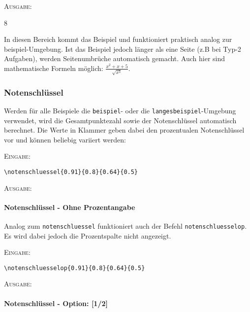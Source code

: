\documentclass[a4paper,12pt]{article}
\begin{document}
\textsc{Ausgabe:}

\begin{langesbeispiel} \item[8] %

In diesen Bereich kommt das Beispiel und funktioniert praktisch analog zur beispiel-Umgebung. Ist das Beispiel jedoch länger als eine Seite (z.B bei Typ-2 Aufgaben), werden Seitenumbrüche automatisch gemacht. Auch hier sind mathematische Formeln möglich:
$\frac{x^2+x+5}{\sqrt{x^3}}$.		

\end{langesbeispiel}



\subsubsection{Notenschlüssel}

Werden für alle Beispiele die \texttt{beispiel}- oder die \texttt{langesbeispiel}-Umgebung verwendet, wird die Gesamtpunktezahl sowie der Notenschlüssel automatisch berechnet. Die Werte in Klammer geben dabei den prozentualen Notenschlüssel vor und können beliebig variiert werden:

\vspace{0.4cm}

\textsc{Eingabe:}
\begin{verbatim}
\notenschluessel{0.91}{0.8}{0.64}{0.5}
\end{verbatim}

\vspace{0.3cm}

\textsc{Ausgabe:}

\normalsize

\paragraph{Notenschlüssel - Ohne Prozentangabe}
Analog zum \texttt{notenschluessel} funktioniert auch der Befehl \texttt{notenschluesselop}. Es wird dabei jedoch die Prozentspalte nicht angezeigt. 

\textsc{Eingabe:}
\begin{verbatim}
\notenschluesselop{0.91}{0.8}{0.64}{0.5}
\end{verbatim}

\textsc{Ausgabe:}

\paragraph{Notenschlüssel - Option: [1/2]}
\end{document}
